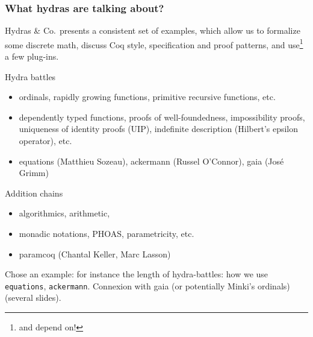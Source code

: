 \documentclass[10pt]{beamer}
\newcommand{\TODO}[2][]{[\textcolor{red}{TODO (#1):} \emph{#2}]}
\newcommand{\coq}{Coq\xspace}
\newcommand{\Hydras}{Hydras \& Co$\text.$\xspace}
\begin{document}
\begin{frame}
  \frametitle{What hydras are talking about?}
  \begin{block}{}
    \Hydras presents a consistent set of examples, which allow us to formalize 
    some \textcolor{mathcolor}{discrete math}, discuss
    \textcolor{coqstylecolor}{\coq style, specification and proof patterns}, and use\footnote{and depend on!} \textcolor{plugincolor}{a few plug-ins}.
  \end{block}
  \begin{block}{Hydra battles}
    \begin{itemize}
\item  \textcolor{mathcolor}{ordinals},
    \textcolor{mathcolor}{rapidly growing functions},
    \textcolor{mathcolor}{primitive recursive functions}, etc.
    \item \textcolor{coqstylecolor}{dependently typed functions},
      \textcolor{coqstylecolor}{proofs of well-foundedness},
         \textcolor{coqstylecolor}{impossibility proofs},
    \textcolor{coqstylecolor}{uniqueness of identity proofs (UIP)},
      \textcolor{coqstylecolor}{indefinite description (Hilbert's epsilon operator)},
    etc.
  \item
 \textcolor{plugincolor}{equations (Matthieu Sozeau)},
    \textcolor{plugincolor}{ackermann (Russel O'Connor)},
      \textcolor{plugincolor}{gaia (Jos\'e Grimm)}
    \end{itemize}
  \end{block}

  \begin{block}{Addition chains}
    \begin{itemize}
    \item    \textcolor{mathcolor}{algorithmics},
       \textcolor{mathcolor}{arithmetic},
  \item 
    \textcolor{coqstylecolor}{monadic notations},
    \textcolor{coqstylecolor}{PHOAS},
  \textcolor{coqstylecolor}{parametricity}, etc.
    \item
      \textcolor{plugincolor}{paramcoq (Chantal Keller, Marc Lasson)} 
          \end{itemize}
  \end{block}
\end{frame}
\begin{frame}
  \TODO{}{Chose an example: for instance the length of hydra-battles: how we use \texttt{equations}, \texttt{ackermann}.
    Connexion with gaia (or potentially Minki's ordinals)
    (several slides).}
\end{frame}
\end{document}
